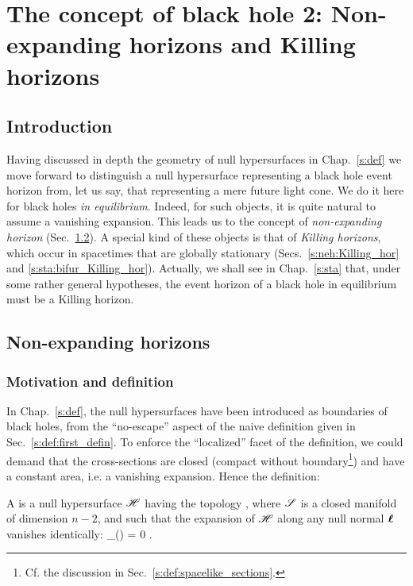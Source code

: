 \chapter{The concept of black hole 2: Non-expanding horizons and Killing horizons}
\label{s:neh}

\minitoc

\section{Introduction}

Having discussed in depth the geometry of null hypersurfaces in Chap.~\ref{s:def}
we move forward to distinguish a null hypersurface representing a black hole event horizon from, let us say, that representing a mere future light cone. We do it here for black holes
\emph{in equilibrium}. Indeed, for such objects, it is quite natural
to assume a vanishing expansion. This leads us to the concept of \emph{non-expanding
horizon} (Sec.~\ref{s:neh:neh}). A special kind of these objects is that
of \emph{Killing horizons}, which occur in spacetimes that are globally
stationary (Secs.~\ref{s:neh:Killing_hor} and \ref{s:sta:bifur_Killing_hor}). Actually, we shall
see in Chap.~\ref{s:sta} that, under some rather general hypotheses, the event horizon of a black hole in equilibrium
must be a Killing horizon.



\section{Non-expanding horizons} \label{s:neh:neh}

\subsection{Motivation and definition} \label{s:neh:def}

In Chap.~\ref{s:def}, the null hypersurfaces have been introduced as boundaries
of black holes, from the ``no-escape'' aspect of the naive definition given in
Sec.~\ref{s:def:first_defin}. To enforce the ``localized'' facet of the definition,
we could demand that the cross-sections are closed (compact without boundary\footnote{Cf. the discussion in Sec.~\ref{s:def:spacelike_sections}.})
and have a constant area, i.e. a vanishing expansion. Hence the definition:
\begin{greybox}
A  is a null hypersurface $\mathscr{H}$ having the
topology
\be \label{e:neh:H_topology}
    \Hor \simeq \R \times \Sp,
\ee
where $\mathscr{S}$ is a closed manifold of dimension $n-2$,
and such that the expansion of $\mathscr{H}$ along any null normal $\bm{\ell}$ vanishes
identically:
\be
    \theta_{(\wl)} = 0 .
\ee
\end{greybox}

